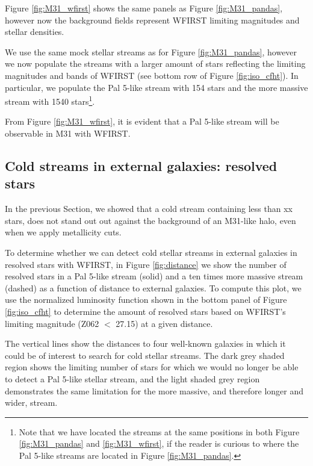 \documentclass[twocolumn]{aastex62}
\begin{document}
Figure \ref{fig:M31_wfirst} shows the same panels as Figure \ref{fig:M31_pandas}, however now the background fields represent WFIRST limiting magnitudes and stellar densities.

We use the same mock stellar streams as for Figure \ref{fig:M31_pandas}, however we now populate the streams with a larger amount of stars reflecting the limiting magnitudes and bands of WFIRST (see bottom row of Figure \ref{fig:iso_cfht}). In particular, we populate the Pal 5-like stream with 154 stars and the more massive stream with 1540 stars\footnote{Note that we have located the streams at the same positions in both Figure \ref{fig:M31_pandas} and \ref{fig:M31_wfirst}, if the reader is curious to where the Pal 5-like streams are located in Figure  \ref{fig:M31_pandas}.}.

From Figure \ref{fig:M31_wfirst}, it is evident that a Pal 5-like stream will be observable in M31 with WFIRST. 



\subsection{Cold streams in external galaxies: resolved stars}
\label{sec:resother}
In the previous Section, we showed that a cold stream containing less than xx stars, does not stand out out against the background of an M31-like halo, even when we apply metallicity cuts. 

To determine whether we can detect cold stellar streams in external galaxies in resolved stars with WFIRST, in Figure \ref{fig:distance} we show the number of resolved stars in a Pal 5-like stream (solid) and a ten times more massive stream (dashed) as a function of distance to external galaxies. To compute this plot, we use the normalized luminosity function shown in the bottom panel of Figure \ref{fig:iso_cfht} to determine the amount of resolved stars based on WFIRST's limiting magnitude (Z062 $<$ 27.15) at a given distance.

The vertical lines show the distances to four well-known galaxies in which it could be of interest to search for cold stellar streams. The dark grey shaded region shows the limiting number of stars for which we would no longer be able to detect a Pal 5-like stellar stream, and the light shaded grey region demonstrates the same limitation for the more massive, and therefore longer and wider, stream. 
\end{document}

